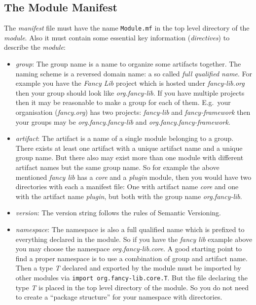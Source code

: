 \documentclass[11pt,a4paper]{report}
\begin{document}
\subsection{The Module Manifest}

The \textit{manifest} file must have the name \texttt{Module.mf} in the top level directory of the \textit{module}. Also it must contain some essential key information (\textit{directives}) to describe the \textit{module}:

\begin{itemize}
    \item \textit{group}: The group name is a name to organize some artifacts together. The naming scheme is a reversed domain name: a so called \textit{full qualified name}. For example you have the \textit{Fancy Lib} project which is hosted under \textit{fancy-lib.org} then your group should look like \textit{org.fancy-lib}. If you have multiple projects then it may be reasonable to make a group for each of them. E.g.\ your organisation (\textit{fancy.org}) has two projects: \textit{fancy-lib} and \textit{fancy-framework} then your groups may be \textit{org.fancy.fancy-lib} and \textit{org.fancy.fancy-framework}.
    \item \textit{artifact}: The artifact is a name of a single module belonging to a group. There exists at least one artifact with a unique artifact name and a unique group name. But there also may exist more than one module with different artifact names but the same group name. So for example the above mentioned \textit{fancy lib} has a \textit{core} and a \textit{plugin} module, then you would have two directories with each a manifest file: One with artifact name \textit{core} and one with the artifact name \textit{plugin}, but both with the group name \textit{org.fancy-lib}.
    \item \textit{version}: The version string follows the rules of Semantic Versioning\cite{semver}.
    \item \textit{namespace}: The namespace is also a full qualified name which is prefixed to everything declared in the module. So if you have the \textit{fancy lib} example above you may choose the namespace \textit{org.fancy-lib.core}. A good starting point to find a proper namespace is to use a combination of group and artifact name. Then a type \textit{T} declared and exported by the module must be imported by other modules via \texttt{import org.fancy-lib.core.T}. But the file declaring the type \textit{T} is placed in the top level directory of the module. So you do not need to create a ``package structure'' for your namespace with directories. 
\end{itemize}
\end{document}

